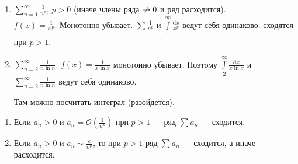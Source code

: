 \begin{example}
     \begin{enumerate}
         \item $\sum\limits_{n=1}^\infty \frac{1}{n^p}$, $p > 0$ (иначе члены ряда $\centernot \to 0$ и ряд расходится).\\
             $f(x) = \frac{1}{x^p}$. Монотонно убывает. $\sum \frac{1}{n^p}$ и $\int\limits_1^\infty \frac{\mathrm{d}x}{x^p}$ ведут себя одинаково: сходятся при  $p > 1$.
         \item $\sum\limits_{n=2}^\infty \frac{1}{n\ln n}$. $f(x) = \frac{1}{x\ln x}$ монотонно убывает. Поэтому $\int\limits_2^\infty \frac{\mathrm{d}x}{x\ln x}$ и $\sum\limits_{n=2}^\infty \frac{1}{n \ln n}$ ведут себя одинаково. 

             Там можно посчитать интеграл (разойдется).
    \end{enumerate}
\end{example}
\begin{consequence}
    \begin{enumerate}
        \item Если $a_n > 0$ и  $a_n = \mathcal{O}(\frac{1}{n^p})$ при $p > 1$ --- ряд  $\sum a_n$ --- сходится.
        \item Если  $a_n > 0$ и  $a_n \sim \frac{c}{n^p}$, то при $p > 1$ ряд  $\sum a_n$ --- сходится, а иначе расходится.
    \end{enumerate}
\end{consequence}

